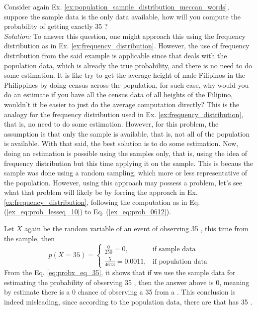 \begin{exmp}
Consider again Ex. \ref{ex:population_sample_distribution_meccan_words}, suppose the sample data is the only data available, how will you compute the probability of getting exactly 35  ?\\
\textit{Solution:} To answer this question, one might approach this using the frequency distribution as in Ex. \ref{ex:frequency_distribution}. However, the use of frequency distribution from the said example is applicable since that deals with the population data, which is already the true probability, and there is no need to do some estimation. It is like try to get the average height of male Filipinos in the Philippines by doing census across the population, for such case, why would you do an estimate if you have all the census data of all heights of the Filipino, wouldn't it be easier to just do the average computation directly? This is the analogy for the frequency distribution used in Ex. \ref{ex:frequency_distribution}, that is, no need to do some estimation. However, for this problem, the assumption is that only the sample is available, that is, not all of the population is available. With that said, the best solution is to do some estimation. Now, doing an estimation is possible using the samples only, that is, using the idea of frequency distribution but this time applying it on the sample. This is becaus the sample was done using a random sampling, which more or less representative of the population. However, using this approach may possess a problem, let's see what that problem will likely be by forcing the approach in Ex. \ref{ex:frequency_distribution}, following the computation as in Eq. (\ref{ex_eq:prob_lesseq_10}) to Eq. (\ref{ex_eq:prob_0612}). 

Let $X$ again be the random variable of an event of observing 35  , this time from the sample, then
\begin{equation}\label{eq:probx_eq_35}
     p(X=35)=\begin{cases}
        \displaystyle\frac{0}{250}=0,&\text{if sample data}\\
        \displaystyle\frac{5}{4613}=0.0011,&\text{if population data}
    \end{cases}
\end{equation}
From the Eq. \ref{eq:probx_eq_35}, it shows that if we use the sample data for estimating the probability of observing 35 , then the answer above is 0, meaning by estimate there is a 0 chance of observing a 35  from a  . This conclusion is indeed misleading, since according to the population data, there are   that has 35  . 


\end{exmp}
